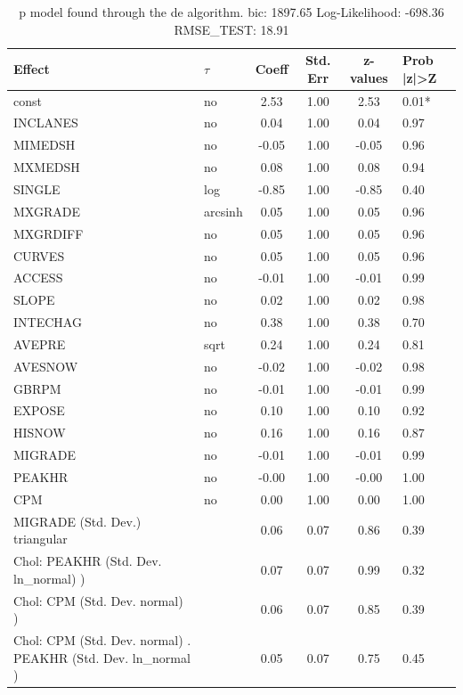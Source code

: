 \begin{table}
	\caption{p model found through the de algorithm. bic: 1897.65 Log-Likelihood: -698.36 RMSE_TEST: 18.91}
	\begin{center}
		\begin{tabular}{|l|l|c|c|c|l|}
			\hline
			Effect & $\tau$ & Coeff & Std. Err & z-values & Prob |z|>Z \\
			\hline
			const & no & 2.53 & 1.00 & 2.53 & 0.01* \\
			\hline
			INCLANES & no & 0.04 & 1.00 & 0.04 & 0.97 \\
			\hline
			MIMEDSH & no & -0.05 & 1.00 & -0.05 & 0.96 \\
			\hline
			MXMEDSH & no & 0.08 & 1.00 & 0.08 & 0.94 \\
			\hline
			SINGLE & log & -0.85 & 1.00 & -0.85 & 0.40 \\
			\hline
			MXGRADE & arcsinh & 0.05 & 1.00 & 0.05 & 0.96 \\
			\hline
			MXGRDIFF & no & 0.05 & 1.00 & 0.05 & 0.96 \\
			\hline
			CURVES & no & 0.05 & 1.00 & 0.05 & 0.96 \\
			\hline
			ACCESS & no & -0.01 & 1.00 & -0.01 & 0.99 \\
			\hline
			SLOPE & no & 0.02 & 1.00 & 0.02 & 0.98 \\
			\hline
			INTECHAG & no & 0.38 & 1.00 & 0.38 & 0.70 \\
			\hline
			AVEPRE & sqrt & 0.24 & 1.00 & 0.24 & 0.81 \\
			\hline
			AVESNOW & no & -0.02 & 1.00 & -0.02 & 0.98 \\
			\hline
			GBRPM & no & -0.01 & 1.00 & -0.01 & 0.99 \\
			\hline
			EXPOSE & no & 0.10 & 1.00 & 0.10 & 0.92 \\
			\hline
			HISNOW & no & 0.16 & 1.00 & 0.16 & 0.87 \\
			\hline
			MIGRADE & no & -0.01 & 1.00 & -0.01 & 0.99 \\
			\hline
			PEAKHR & no & -0.00 & 1.00 & -0.00 & 1.00 \\
			\hline
			CPM & no & 0.00 & 1.00 & 0.00 & 1.00 \\
			\hline
			MIGRADE (Std. Dev.) triangular &  & 0.06 & 0.07 & 0.86 & 0.39 \\
			\hline
			 Chol: PEAKHR (Std. Dev. ln_normal) ) &  & 0.07 & 0.07 & 0.99 & 0.32 \\
			\hline
			 Chol: CPM (Std. Dev. normal) ) &  & 0.06 & 0.07 & 0.85 & 0.39 \\
			\hline
			 Chol: CPM (Std. Dev. normal) . PEAKHR (Std. Dev.   ln_normal ) &  & 0.05 & 0.07 & 0.75 & 0.45 \\
			\hline
		\end{tabular}
	\end{center}
\end{table}